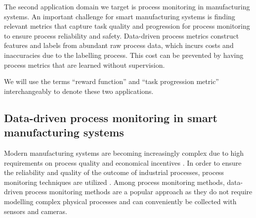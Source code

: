 \documentclass[\home/main.tex]{subfiles}
\begin{document}
The second application domain we target is process monitoring in manufacturing systems. An important challenge for smart manufacturing systems is finding relevant metrics that capture task quality and progression for process monitoring to ensure process reliability and safety.
Data-driven process metrics construct features and labels from abundant raw process data, which incurs costs and inaccuracies due to the labelling process. This cost can be prevented by having process metrics that are learned without supervision.

We will use the terms \enquote{reward function} and \enquote{task progression metric} interchangeably to denote these two applications.

\subsection{Data-driven process monitoring in smart manufacturing systems}
Modern manufacturing systems are becoming increasingly complex due to high requirements on process quality and economical incentives \autocite{Yin2015}. In order to ensure the reliability and quality of the outcome of industrial processes, process monitoring techniques are utilized \autocite{Ge2013}. Among process monitoring methods, data-driven process monitoring methods are a popular approach as they do not require modelling complex physical processes and can conveniently be collected with sensors and cameras.
\end{document}
